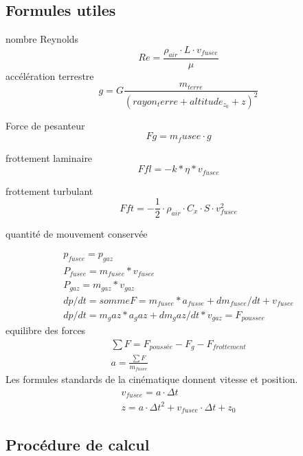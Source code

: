 \documentclass[12pt,a4paper]{article}
\begin{document}
\subsection{Formules utiles}
nombre Reynolds
\begin{equation}
	Re=\frac{\rho_{air} \cdot L \cdot v_{fusee}}{\mu}
\end{equation}
accélération terrestre
\begin{equation}
	g= G \frac{m_{terre}}{(rayon_terre+altitude_{z_0}+z)^2}
\end{equation}

Force de pesanteur
\begin{equation}
	Fg=m_fusee \cdot g
\end{equation}

frottement laminaire
\begin{equation}
	Ffl=-k*\eta*v_{fusee}
\end{equation}

frottement turbulant
\begin{equation}
	Fft=-\frac{1}{2} \cdot \rho_{air} \cdot C_x \cdot S \cdot v_{fusee}^2
\end{equation}

quantité de mouvement conservée

\begin{eqnarray}
	p_{fusee}=p_{gaz}\\
	P_{fusee}=m_{fusee}*v_{fusee}\\
	P_{gaz}=m_{gaz}*v_{gaz}\\
	dp/dt=somme F=m_{fusee}*a_{fusse}+ d m_{fusee}/dt+v_{fusee}\\
	dp/dt=m_gaz*a_gaz+d m_gaz/dt*v_{gaz}=F_{poussee}
\end{eqnarray}
equilibre des forces
\begin{eqnarray}
	\sum F=F_{poussée}-F_g-F_{frottement}\\
	a=\frac{\sum F}{m_{fusee}}
\end{eqnarray}
Les formules standards de la cinématique donnent vitesse et position. 
\begin{eqnarray}
	v_{fusee}=a \cdot \Delta t\\
	z=a \cdot \Delta t^2+v_{fusee} \cdot \Delta t+z_0
\end{eqnarray}



\subsection{Procédure de calcul}
\end{document}
